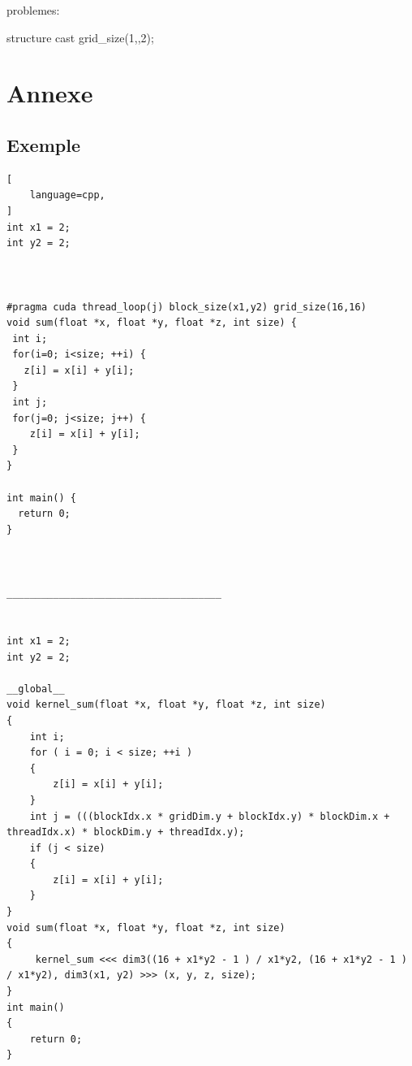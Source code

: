 \documentclass{article}
\begin{document}
problemes:

structure
cast
grid\_size(1,,2);

\newpage
	\section{Annexe}

	\subsection{Exemple}

	\begin{lstlisting}[
    language=cpp,
]
int x1 = 2;
int y2 = 2;



#pragma cuda thread_loop(j) block_size(x1,y2) grid_size(16,16)
void sum(float *x, float *y, float *z, int size) {
 int i;
 for(i=0; i<size; ++i) {
   z[i] = x[i] + y[i];
 }
 int j;
 for(j=0; j<size; j++) {
    z[i] = x[i] + y[i];
 }
}

int main() {
  return 0;
}



_____________________________________


int x1 = 2;
int y2 = 2;

__global__
void kernel_sum(float *x, float *y, float *z, int size)
{
	int i;
	for ( i = 0; i < size; ++i )
	{
		z[i] = x[i] + y[i];
	}
	int j = (((blockIdx.x * gridDim.y + blockIdx.y) * blockDim.x + threadIdx.x) * blockDim.y + threadIdx.y);
	if (j < size)
	{
		z[i] = x[i] + y[i];
	}
}
void sum(float *x, float *y, float *z, int size)
{
	 kernel_sum <<< dim3((16 + x1*y2 - 1 ) / x1*y2, (16 + x1*y2 - 1 ) / x1*y2), dim3(x1, y2) >>> (x, y, z, size);
}
int main()
{
	return 0;
}
\end{lstlisting}
\end{document}
